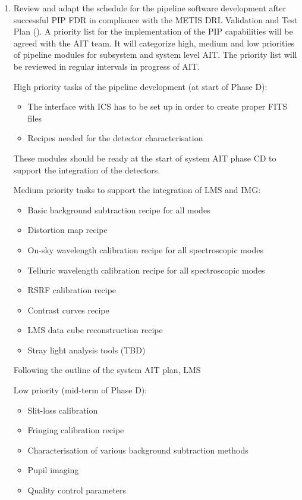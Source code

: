 \begin{enumerate}
    \item Review and adapt the schedule for the pipeline software development after successful PIP FDR in compliance with the METIS DRL Validation and Test Plan (\cite{DRLVT}). A priority list for the implementation of the PIP capabilities will be agreed with the AIT team. It will categorize high, medium and low priorities of pipeline modules for subsystem and system level AIT. The priority list will be reviewed in regular intervals in progress of AIT.
   
    High priority tasks of the pipeline development (at start of Phase D): 
    \begin{itemize}
        \item The interface with ICS has to be set up in order to create proper FITS files 
        \item Recipes needed for the detector characterisation
    \end{itemize} 
    These modules should be ready at the start of system AIT phase CD to support the integration of the detectors.
    
    Medium priority tasks to support the integration of LMS and IMG:
    \begin{itemize}
        \item Basic background subtraction recipe for all modes
        \item Distortion map recipe
        \item On-sky wavelength calibration recipe for all spectroscopic modes 
        \item Telluric wavelength calibration recipe for all spectroscopic modes
        \item RSRF calibration recipe
        \item Contrast curves recipe
        \item LMS data cube reconstruction recipe
        \item Stray light analysis tools (TBD)
    \end{itemize}
    Following the outline of the system AIT plan, LMS

    Low priority (mid-term of Phase D):
    \begin{itemize}
        \item Slit-loss calibration
        \item Fringing calibration recipe 
        \item Characterisation of various background subtraction methods
        \item Pupil imaging
        \item Quality control parameters
    \end{itemize}
    

\end{enumerate}
